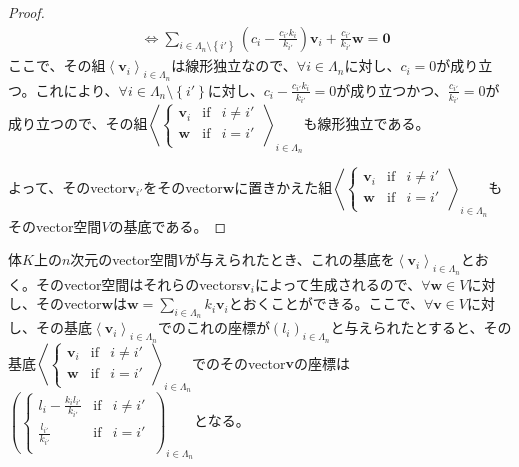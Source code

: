 \documentclass[dvipdfmx]{jsarticle}
\begin{document}
\begin{proof}
\begin{align*}
&\Leftrightarrow \sum_{i \in \varLambda_{n} \setminus \left\{ i' \right\}} {\left( c_{i} - \frac{c_{i'}k_{i}}{k_{i'}} \right)\mathbf{v}_{i}} + \frac{c_{i'}}{k_{i'}}\mathbf{w} = \mathbf{0}
\end{align*}
ここで、その組$\left\langle \mathbf{v}_{i} \right\rangle_{i \in \varLambda_{n}}$は線形独立なので、$\forall i \in \varLambda_{n}$に対し、$c_{i} = 0$が成り立つ。これにより、$\forall i \in \varLambda_{n} \setminus \left\{ i' \right\}$に対し、$c_{i} - \frac{c_{i'}k_{i}}{k_{i'}} = 0$が成り立つかつ、$\frac{c_{i'}}{k_{i'}} = 0$が成り立つので、その組$\left\langle \left\{ \begin{matrix}
\mathbf{v}_{i} & \mathrm{if}  & i \neq i' \\
\mathbf{w} & \mathrm{if}  & i = i' \\
\end{matrix} \right.\  \right\rangle_{i \in \varLambda_{n}}$も線形独立である。\par
よって、そのvector$\mathbf{v}_{i'}$をそのvector$\mathbf{w}$に置きかえた組$\left\langle \left\{ \begin{matrix}
\mathbf{v}_{i} & \mathrm{if}  & i \neq i' \\
\mathbf{w} & \mathrm{if}  & i = i' \\
\end{matrix} \right.\  \right\rangle_{i \in \varLambda_{n}}$もそのvector空間$V$の基底である。
\end{proof}
\begin{thm}\label{2.1.1.24}
体$K$上の$n$次元のvector空間$V$が与えられたとき、これの基底を$\left\langle \mathbf{v}_{i} \right\rangle_{i \in \varLambda_{n}}$とおく。そのvector空間はそれらのvectors$\mathbf{v}_{i}$によって生成されるので、$\forall\mathbf{w} \in V$に対し、そのvector$\mathbf{w}$は$\mathbf{w} = \sum_{i \in \varLambda_{n}} {k_{i}\mathbf{v}_{i}}$とおくことができる。ここで、$\forall\mathbf{v} \in V$に対し、その基底$\left\langle \mathbf{v}_{i} \right\rangle_{i \in \varLambda_{n}}$でのこれの座標が$\left( l_{i} \right)_{i \in \varLambda_{n}}$と与えられたとすると、その基底$\left\langle \left\{ \begin{matrix}
\mathbf{v}_{i} & \mathrm{if}  & i \neq i' \\
\mathbf{w} & \mathrm{if}  & i = i' \\
\end{matrix} \right.\  \right\rangle_{i \in \varLambda_{n}}$でのそのvector$\mathbf{v}$の座標は$\left( \left\{ \begin{matrix}
l_{i} - \frac{k_{i}l_{i'}}{k_{i'}} & \mathrm{if}  & i \neq i' \\
\frac{l_{i'}}{k_{i'}} & \mathrm{if}  & i = i' \\
\end{matrix} \right.\  \right)_{i \in \varLambda_{n}}$となる。
\end{thm}
\end{document}

